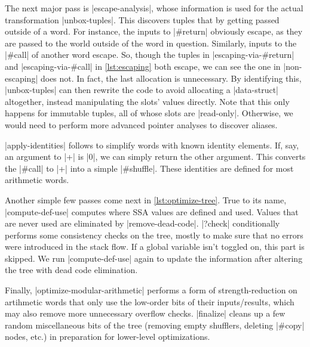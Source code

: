 
The next major pass is \factor|escape-analysis|, whose information is used for
the actual transformation \factor|unbox-tuples|.  This discovers tuples that
 by getting passed outside of a word.  For instance, the inputs to
\factor|#return| obviously escape, as they are passed to the world outside of
the word in question.  Similarly, inputs to the \factor|#call| of another word
escape.  So, though the tuples in \factor|escaping-via-#return| and
\factor|escaping-via-#call| in \vref{lst:escaping} both escape, we can see the
one in \factor|non-escaping| does not.  In fact, the last allocation is
unnecessary.  By identifying this, \factor|unbox-tuples| can then rewrite the
code to avoid allocating a \factor|data-struct| altogether, instead
manipulating the slots' values directly.  Note that this only happens for
immutable tuples, all of whose slots are \factor|read-only|.  Otherwise, we
would need to perform more advanced pointer analyses to discover aliases.

\factor|apply-identities| follows to simplify words with known identity
elements.  If, say, an argument to \factor|+| is \factor|0|, we can simply
return the other argument.  This converts the \factor|#call| to \factor|+| into
a simple \factor|#shuffle|.  These identities are defined for most arithmetic
words.

Another simple few passes come next in \vref{lst:optimize-tree}.  True to its
name, \factor|compute-def-use| computes where \gls{SSA} values are defined and
used.  Values that are never used are eliminated by \factor|remove-dead-code|.
\factor|?check| conditionally performs some consistency checks on the tree,
mostly to make sure that no errors were introduced in the stack flow.  If a
global variable isn't toggled on, this part is skipped.  We run
\factor|compute-def-use| again to update the information after altering the
tree with dead code elimination.

Finally, \factor|optimize-modular-arithmetic| performs a form of
strength-reduction on artihmetic words that only use the low-order bits of
their inputs/results, which may also remove more unnecessary overflow checks.
\factor|finalize| cleans up a few random miscellaneous bits of the tree
(removing empty shufflers, deleting \factor|#copy| nodes, etc.) in preparation
for lower-level optimizations.

